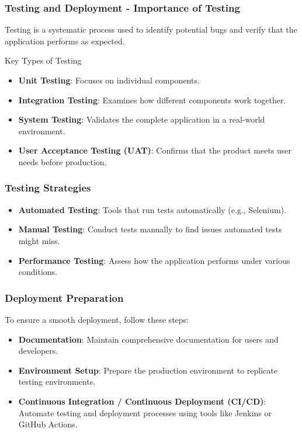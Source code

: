 \documentclass[aspectratio=169]{beamer}
\begin{document}
\begin{frame}[fragile]
    \frametitle{Testing and Deployment - Importance of Testing}
    Testing is a systematic process used to identify potential bugs and verify that the application performs as expected. 

    \begin{block}{Key Types of Testing}
        \begin{itemize}
            \item \textbf{Unit Testing}: Focuses on individual components.
            \item \textbf{Integration Testing}: Examines how different components work together.
            \item \textbf{System Testing}: Validates the complete application in a real-world environment.
            \item \textbf{User Acceptance Testing (UAT)}: Confirms that the product meets user needs before production.
        \end{itemize}
    \end{block}
\end{frame}

\begin{frame}[fragile]
    \frametitle{Testing Strategies}
    \begin{itemize}
        \item \textbf{Automated Testing}: Tools that run tests automatically (e.g., Selenium).
        \item \textbf{Manual Testing}: Conduct tests manually to find issues automated tests might miss.
        \item \textbf{Performance Testing}: Assess how the application performs under various conditions.
    \end{itemize}
\end{frame}

\begin{frame}[fragile]
    \frametitle{Deployment Preparation}
    To ensure a smooth deployment, follow these steps:
    \begin{itemize}
        \item \textbf{Documentation}: Maintain comprehensive documentation for users and developers.
        \item \textbf{Environment Setup}: Prepare the production environment to replicate testing environments.
        \item \textbf{Continuous Integration / Continuous Deployment (CI/CD)}: Automate testing and deployment processes using tools like Jenkins or GitHub Actions.
    \end{itemize}
\end{frame}
\end{document}
